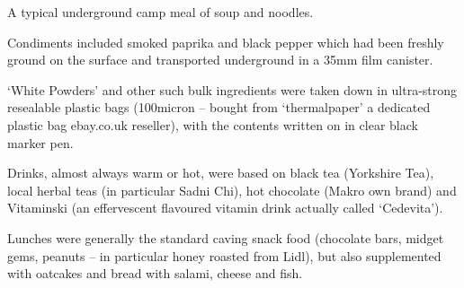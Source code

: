 \begin{marginfigure}
\checkoddpage \ifoddpage \forcerectofloat \else \forceversofloat \fi
\centering
 \caption{A typical underground camp meal of soup and noodles. }
 \label{soup noodles}
\end{marginfigure}

Condiments included smoked paprika and black pepper which had been freshly ground on the surface and transported underground in a 35mm film canister.

`White Powders' and other such bulk ingredients were taken down in ultra-strong resealable plastic bags (100micron -- bought from `thermalpaper' a dedicated plastic bag ebay.co.uk reseller), with the contents written on in clear black marker pen.

Drinks, almost always warm or hot, were based on black tea (Yorkshire Tea), local herbal teas (in particular Sadni Chi), hot chocolate (Makro own brand) and Vitaminski (an effervescent flavoured vitamin drink actually called `Cedevita').

Lunches were generally the standard caving snack food (chocolate bars, midget gems, peanuts -- in particular honey roasted from Lidl), but also supplemented with oatcakes and bread with salami, cheese and fish.

